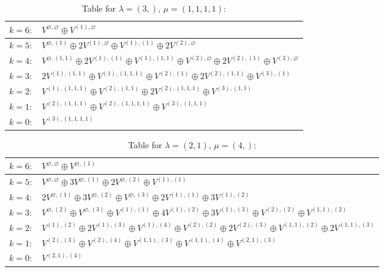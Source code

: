 \documentclass[a4paper,12pt]{article}
\begin{document}
\renewcommand{\arraystretch}{1.6} 
\begin{table}[H]
\centering
\caption{Table for $\lambda = (3,)$, $\mu = (1, 1, 1, 1)$:}
\begin{tabular}{|>{\centering\arraybackslash}p{15cm}|}
\hline
 $k = 6: \quad V^{\varnothing, \varnothing} \oplus V^{(1), \varnothing} $ \\ \hline
 $k = 5: \quad V^{\varnothing, (1)} \oplus 2 V^{(1), \varnothing} \oplus V^{(1), (1)} \oplus 2 V^{(2), \varnothing} $ \\ \hline
 $k = 4: \quad V^{\varnothing, (1, 1)} \oplus 2 V^{(1), (1)} \oplus V^{(1), (1, 1)} \oplus V^{(2), \varnothing} \oplus 2 V^{(2), (1)} \oplus V^{(3), \varnothing} $ \\ \hline
 $k = 3: \quad 2 V^{(1), (1, 1)} \oplus V^{(1), (1, 1, 1)} \oplus V^{(2), (1)} \oplus 2 V^{(2), (1, 1)} \oplus V^{(3), (1)} $ \\ \hline
 $k = 2: \quad V^{(1), (1, 1, 1)} \oplus V^{(2), (1, 1)} \oplus 2 V^{(2), (1, 1, 1)} \oplus V^{(3), (1, 1)} $ \\ \hline
 $k = 1: \quad V^{(2), (1, 1, 1)} \oplus V^{(2), (1, 1, 1, 1)} \oplus V^{(3), (1, 1, 1)} $ \\ \hline
 $k = 0: \quad V^{(3), (1, 1, 1, 1)} $ \\ \hline
\end{tabular}
\end{table}

\renewcommand{\arraystretch}{1.6} 
\begin{table}[H]
\centering
\caption{Table for $\lambda = (2, 1)$, $\mu = (4,)$:}
\begin{tabular}{|>{\centering\arraybackslash}p{15cm}|}
\hline
 $k = 6: \quad V^{\varnothing, \varnothing} \oplus V^{\varnothing, (1)} $ \\ \hline
 $k = 5: \quad V^{\varnothing, \varnothing} \oplus 3 V^{\varnothing, (1)} \oplus 2 V^{\varnothing, (2)} \oplus V^{(1), (1)} $ \\ \hline
 $k = 4: \quad 2 V^{\varnothing, (1)} \oplus 3 V^{\varnothing, (2)} \oplus V^{\varnothing, (3)} \oplus 2 V^{(1), (1)} \oplus 3 V^{(1), (2)} $ \\ \hline
 $k = 3: \quad V^{\varnothing, (2)} \oplus V^{\varnothing, (3)} \oplus V^{(1), (1)} \oplus 4 V^{(1), (2)} \oplus 3 V^{(1), (3)} \oplus V^{(2), (2)} \oplus V^{(1, 1), (2)} $ \\ \hline
 $k = 2: \quad V^{(1), (2)} \oplus 2 V^{(1), (3)} \oplus V^{(1), (4)} \oplus V^{(2), (2)} \oplus 2 V^{(2), (3)} \oplus V^{(1, 1), (2)} \oplus 2 V^{(1, 1), (3)} $ \\ \hline
 $k = 1: \quad V^{(2), (3)} \oplus V^{(2), (4)} \oplus V^{(1, 1), (3)} \oplus V^{(1, 1), (4)} \oplus V^{(2, 1), (3)} $ \\ \hline
 $k = 0: \quad V^{(2, 1), (4)} $ \\ \hline
\end{tabular}
\end{table}
\end{document}
